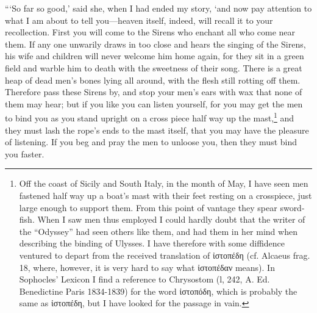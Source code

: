 “‘So far so good,’ said she, when I had ended my story, ‘and now pay attention
to what I am about to tell you—heaven itself, indeed, will recall it to your
recollection. First you will come to the Sirens who enchant all who come near
them. If any one unwarily draws in too close and hears the singing of the
Sirens, his wife and children will never welcome him home again, for they sit
in a green field and warble him to death with the sweetness of their song.
There is a great heap of dead men’s bones lying all around, with the flesh
still rotting off them. Therefore pass these Sirens by, and stop your men’s
ears with wax that none of them may hear; but if you like you can listen
yourself, for you may get the men to bind you as you stand upright on a cross
piece half way up the mast,\footnote{Off the coast of Sicily and South Italy, in the month of May, I have seen
men fastened half way up a boat’s mast with their feet resting on a
crosspiece, just large enough to support them. From this point of vantage they
spear sword-fish. When I saw men thus employed I could hardly doubt that the
writer of the “Odyssey” had seen others like them, and had them in her mind
when describing the binding of Ulysses. I have therefore with some diffidence
ventured to depart from the received translation of
ἰστοπέδη (cf. Alcaeus frag. 18,
where, however, it is very hard to say what
ἰστοπέδαν means). In Sophocles’
Lexicon I find a reference to Chrysostom (l, 242, A. Ed. Benedictine Paris
1834-1839) for the word ἰστοπόδη,
which is probably the same as
ἰστοπέδη, but I have looked for the
passage in vain.} and they must lash the rope’s ends to
the mast itself, that you may have the pleasure of listening. If you beg and
pray the men to unloose you, then they must bind you faster.

